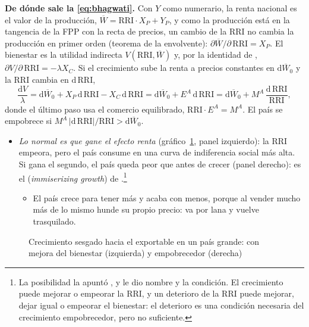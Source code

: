 \documentclass[11pt]{article}
\begin{document}
\begin{anotaciones}
\textbf{De dónde sale la \eqref{eq:bhagwati}.} Con $Y$ como numerario, la renta nacional es el valor de la producción, $\overline W=\mathrm{RRI}\cdot X_P+Y_P$, y como la producción está en la tangencia de la FPP con la recta de precios, un cambio de la RRI no cambia la producción en primer orden (teorema de la envolvente): $\partial\overline W/\partial\,\mathrm{RRI}=X_P$. El bienestar es la utilidad indirecta $V(\mathrm{RRI},\overline W)$ y, por la identidad de  , $\partial V/\partial\,\mathrm{RRI}=-\lambda X_C$. Si el crecimiento sube la renta a precios constantes en $\mathrm{d}\overline W_0$ y la RRI cambia en $\mathrm{d}\,\mathrm{RRI}$,
\[
\frac{\mathrm{d}V}{\lambda}=\mathrm{d}\overline W_0+X_P\,\mathrm{d}\,\mathrm{RRI}-X_C\,\mathrm{d}\,\mathrm{RRI}=\mathrm{d}\overline W_0+E^A\,\mathrm{d}\,\mathrm{RRI}=\mathrm{d}\overline W_0+M^A\,\frac{\mathrm{d}\,\mathrm{RRI}}{\mathrm{RRI}},
\]
donde el último paso usa el comercio equilibrado, $\mathrm{RRI}\cdot E^A=M^A$. El país se empobrece si $M^A\,\lvert\mathrm{d}\,\mathrm{RRI}\rvert/\mathrm{RRI}>\mathrm{d}\overline W_0$.\findemo
\end{anotaciones}
\begin{itemize}
\item \emph{Lo normal es que gane el efecto renta} (gráfico~\ref{fig:bienestar-grande}, panel izquierdo): la RRI empeora, pero el país consume en una curva de indiferencia social más alta. Si gana el segundo, el país queda peor que antes de crecer (panel derecho): es el  (\emph{immiserizing growth}) de \textcite{Bhagwati1958Immiserizing}.\footnote{La posibilidad la apuntó \textcite{Edgeworth1894Theory}, y \textcite{Bhagwati1958Immiserizing} le dio nombre y la condición. El crecimiento puede mejorar o empeorar la RRI, y un deterioro de la RRI puede mejorar, dejar igual o empeorar el bienestar: el deterioro es una condición necesaria del crecimiento empobrecedor, pero no suficiente.}
  \begin{itemize}
  \item El país crece para tener más y acaba con menos, porque al vender mucho más de lo mismo hunde su propio precio: va por lana y vuelve trasquilado.
  \end{itemize}
\end{itemize}
\begin{figure}[H]
\centering
\caption{Crecimiento sesgado hacia el exportable en un país grande: con mejora del bienestar (izquierda) y empobrecedor (derecha)}\label{fig:bienestar-grande}
\end{figure}
\end{document}
